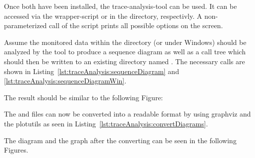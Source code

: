 \noindent Once both have been installed, the trace-analysis-tool can be used. It can be accessed via the wrapper-script  or  in the  directory, respectivly.  A non-parameterized call of the script prints all possible options on the screen.

Assume the monitored data within the directory  (or  under Windows) should be analyzed by the tool to produce a sequence diagram as well as a call tree which should then be written to an existing directory named . %
The necessary calls are shown in Listing~\ref{lst:traceAnalysis:sequenceDiagram} and \ref{lst:traceAnalysis:sequenceDiagramWin}.

\setBashListing


The result should be similar to the following Figure:
\begin{figure}[H]
\begin{graybox}
\end{graybox}
\end{figure}
The  and  files can now be converted into a readable format by using graphviz and the plotutils as seen in Listing~\ref{lst:traceAnalysis:convertDiagrams}.

The diagram and the graph after the converting can be seen in the following Figures.

